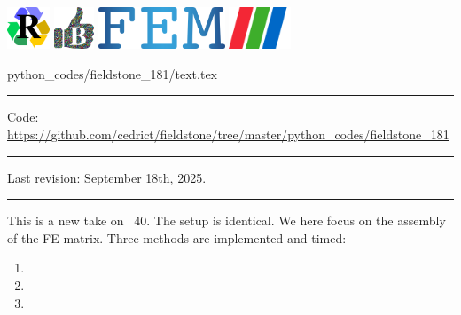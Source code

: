 \noindent
\includegraphics[height=1.25cm]{images/pictograms/replication}
\includegraphics[height=1.25cm]{images/pictograms/benchmark}
\includegraphics[height=1.25cm]{images/pictograms/FEM}
\includegraphics[height=1.25cm]{images/pictograms/paraview}


\begin{flushright} {\tiny {\color{gray} python\_codes/fieldstone\_181/text.tex}} \end{flushright}

%

\par\noindent\rule{\textwidth}{0.4pt}

\begin{center}
\inpython
{\small Code: \url{https://github.com/cedrict/fieldstone/tree/master/python_codes/fieldstone_181}}
\end{center}

\par\noindent\rule{\textwidth}{0.4pt}

Last revision: September 18th, 2025.

\par\noindent\rule{\textwidth}{0.4pt}


This \stone is a new take on \stone~40. 
The setup is identical. We here focus on the assembly of the FE matrix. 
Three methods are implemented and timed:
\begin{enumerate}
\item 
\item 
\item 
\end{enumerate}

